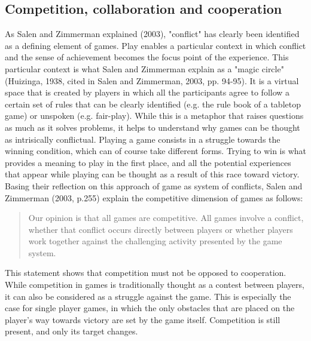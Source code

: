 \subsection{Competition, collaboration and cooperation}
As Salen and Zimmerman explained (2003)\cite{book:rop}, "conflict" has clearly been identified as a defining element of games. Play enables a particular context in which conflict and the sense of achievement becomes the focus point of the experience. This particular context is what Salen and Zimmerman explain as a "magic circle" (Huizinga, 1938, cited in Salen and Zimmerman, 2003, pp. 94-95)\cite{book:rop}. It is a virtual space that is created by players in which all the participants agree to follow a certain set of rules that can be clearly identified (e.g. the rule book of a tabletop game) or unspoken (e.g. fair-play). While this is a metaphor that raises questions as much as it solves problems, it helps to understand why games can be thought as intrisically conflictual. Playing a game consists in a struggle towards the winning condition, which can of course take different forms. Trying to win is what provides a meaning to play in the first place, and all the potential experiences that appear while playing can be thought as a result of this race toward victory. Basing their reflection on this approach of game as system of conflicts, Salen and Zimmerman (2003, p.255)\cite{book:rop} explain the competitive dimension of games as follows:
\begin{quotation}
Our opinion is that all games are competitive. All games involve a conflict, whether that conflict occurs directly between players or whether players work together against the challenging activity presented by the game system.
\end{quotation}
This statement shows that competition must not be opposed to cooperation. While competition in games is traditionally  thought as a contest between players, it can also be considered as a struggle against the game. This is especially the case for single player games, in which the only obstacles that are placed on the player's way towards victory are set by the game itself. Competition is still present, and only its target changes. 

